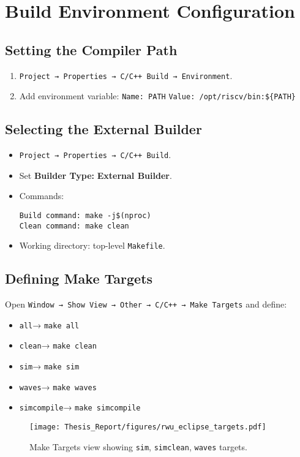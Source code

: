\section{Build Environment Configuration}
\subsection{Setting the Compiler Path}
\begin{enumerate}
  \item \texttt{Project → Properties → C/C++ Build → Environment}.
  \item Add environment variable:  
        \texttt{Name: PATH} \texttt{Value: /opt/riscv/bin:\$\{PATH\}}
\end{enumerate}

\subsection{Selecting the External Builder}
\begin{itemize}
  \item \texttt{Project → Properties → C/C++ Build}.
  \item Set \textbf{Builder Type:} \textbf{External Builder}.
  \item Commands:
\begin{verbatim}
Build command: make -j$(nproc)
Clean command: make clean
\end{verbatim}
  \item Working directory: top-level \texttt{Makefile}.
\end{itemize}

\subsection{Defining Make Targets}
Open \texttt{Window → Show View → Other → C/C++ → Make Targets} and define:
\begin{itemize}
  \item \texttt{all}→ \texttt{make all}
  \item \texttt{clean}→ \texttt{make clean}
  \item \texttt{sim}→ \texttt{make sim}
  \item \texttt{waves}→ \texttt{make waves}
  \item \texttt{simcompile}→ \texttt{make simcompile}
\end{itemize}

\begin{figure}[H]
  \centering
  \texttt{[image: Thesis\_Report/figures/rwu\_eclipse\_targets.pdf]}
  \caption{Make Targets view showing \texttt{sim}, \texttt{simclean}, \texttt{waves} targets.}
  \label{fig:rwu_eclipse_targets}
\end{figure}

